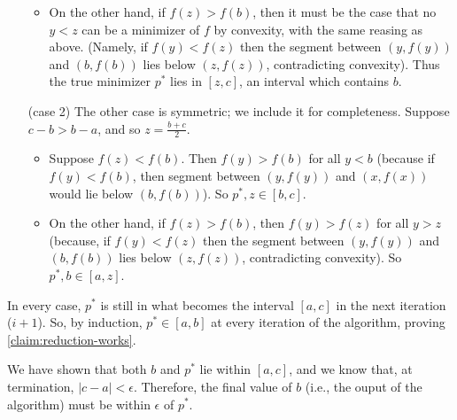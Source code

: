 \begin{lproof}
\begin{itemize}[leftmargin=4em]
\begin{itemize}[leftmargin=-1em]
                \item On the other hand, if $f(z) > f(b)$, then it must be the case that no $y < z$ can be a minimizer of $f$ by convexity, with the same reasing as above.
                (Namely, if $f(y) < f(z)$ then the segment between $(y,f(y))$ and $(b,f(b))$ lies below $(z,f(z))$, contradicting convexity).
                Thus the true minimizer $p^*$ lies in $[z,c]$, an interval which contains $b$.
            \end{itemize}
            \item [(case 2)] The other case is symmetric; we include it for completeness. Suppose $c-b > b-a$,
                and so $z = \frac{b+c}{2}$.
            \begin{itemize}[leftmargin=-1em]
                \item Suppose $f(z) < f(b)$. Then $f(y) > f(b)$ for  all $y < b$
                (because if $f(y) < f(b)$, then segment between $(y, f(y))$ and $(x, f(x))$ would lie  below $(b, f(b))$).
                So $p^*, z \in [b, c]$.

                \item On the other hand, if $f(z) > f(b)$, then $f(y) > f(z)$ for all $y > z$
                (because, if $f(y) < f(z)$ then the segment between $(y,f(y))$ and $(b,f(b))$ lies below $(z,f(z))$, contradicting convexity).
                So $p^*, b \in [a,z]$. \qedhere
            \end{itemize}
        \end{itemize}
        In every case, $p^*$ is still in what becomes
        the interval $[a,c]$ in the next iteration ($i+1$).
        So, by induction, $p^* \in [a,b]$ at every iteration of the algorithm,
        proving \cref{claim:reduction-works}.
        \qedsymbol

    We have shown that both $b$ and $p^*$ lie within $[a,c]$,
    and we know that, at termination, $|c-a| < \epsilon$.
    Therefore, the final value of $b$ (i.e., the ouput of the algorithm)
        must be within $\epsilon$ of $p^*$.





\end{lproof}
